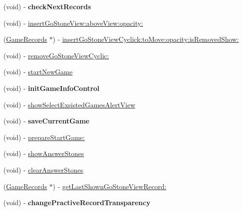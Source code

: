 \begin{DoxyCompactItemize}
\item 
\hypertarget{interface_abstract_record_view_controller_a6b981a14f16bb0b25431714ec0678b73}{
(void) -\/ {\bfseries checkNextRecords}}
\label{interface_abstract_record_view_controller_a6b981a14f16bb0b25431714ec0678b73}

\item 
(void) -\/ \hyperlink{interface_abstract_record_view_controller_a7a55e5530e121e0b39f035dca29e8577}{insertGoStoneView:aboveView:opacity:}
\item 
(\hyperlink{interface_game_records}{GameRecords} $\ast$) -\/ \hyperlink{interface_abstract_record_view_controller_a6b332a9fa53a850166a12a5f5d6a99fe}{insertGoStoneViewCyclick:toMove:opacity:isRemovedShow:}
\item 
(void) -\/ \hyperlink{interface_abstract_record_view_controller_a7e16eb8996e2d0b5d825374d564a533c}{removeGoStoneViewCyclic:}
\item 
(void) -\/ \hyperlink{interface_abstract_record_view_controller_a67b4f0f87e9ed347378125b6a834cfdd}{startNewGame}
\item 
\hypertarget{interface_abstract_record_view_controller_a3edda20fcfcbeb5c4f3a453aedbfc1e2}{
(void) -\/ {\bfseries initGameInfoControl}}
\label{interface_abstract_record_view_controller_a3edda20fcfcbeb5c4f3a453aedbfc1e2}

\item 
(void) -\/ \hyperlink{interface_abstract_record_view_controller_a1c50772482cb391a0317ac01b8fbdc51}{showSelectExsistedGamesAlertView}
\item 
\hypertarget{interface_abstract_record_view_controller_a6ac797433b51ead28bcad34f1ca007b3}{
(void) -\/ {\bfseries saveCurrentGame}}
\label{interface_abstract_record_view_controller_a6ac797433b51ead28bcad34f1ca007b3}

\item 
(void) -\/ \hyperlink{interface_abstract_record_view_controller_af72ba6db1ca2fc1e23ddcaf324a71388}{prepareStartGame:}
\item 
(void) -\/ \hyperlink{interface_abstract_record_view_controller_a1eb9d4c04d8d2922b3531ec8fafd1bb0}{showAnswerStones}
\item 
(void) -\/ \hyperlink{interface_abstract_record_view_controller_a3600f7d5e1e176f16fc6707ca9e59bd3}{clearAnswerStones}
\item 
(\hyperlink{interface_game_records}{GameRecords} $\ast$) -\/ \hyperlink{interface_abstract_record_view_controller_a826af0d182748e78f8798d2fe5cc2b6d}{getLastShownGoStoneViewRecord:}
\item 
\hypertarget{interface_abstract_record_view_controller_a019625ec4026858785a1579676a1f69b}{
(void) -\/ {\bfseries changePractiveRecordTransparency}}
\label{interface_abstract_record_view_controller_a019625ec4026858785a1579676a1f69b}


\end{DoxyCompactItemize}
